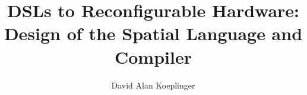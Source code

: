 \documentclass{report}
\begin{document}
\title{DSLs to Reconfigurable Hardware:\\Design of the Spatial Language and Compiler}
\author{David Alan Koeplinger}
\end{document}
